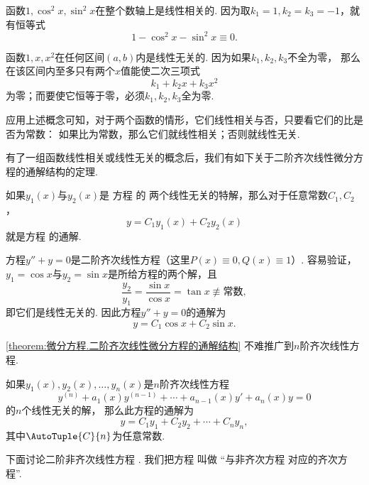 \begin{example}
函数\(1,\cos^2 x, \sin^2 x\)在整个数轴上是线性相关的.
因为取\(k_1=1,k_2=k_3=-1\)，就有恒等式\[
	1 - \cos^2 x - \sin^2 x \equiv 0.
\]

函数\(1,x,x^2\)在任何区间\((a,b)\)内是线性无关的.
因为如果\(k_1,k_2,k_3\)不全为零，
那么在该区间内至多只有两个\(x\)值能使二次三项式\[
	k_1 + k_2 x + k_3 x^2
\]为零；而要使它恒等于零，必须\(k_1,k_2,k_3\)全为零.
\end{example}

应用上述概念可知，对于两个函数的情形，它们线性相关与否，只要看它们的比是否为常数：
如果比为常数，那么它们就线性相关；否则就线性无关.

有了一组函数线性相关或线性无关的概念后，我们有如下关于二阶齐次线性微分方程的通解结构的定理.
\begin{theorem}\label{theorem:微分方程.二阶齐次线性微分方程的通解结构}
如果\(y_1(x)\)与\(y_2(x)\)是
方程  的
两个线性无关的特解，那么对于任意常数\(C_1,C_2\)，\[
	y = C_1 y_1(x) + C_2 y_2(x)
\]
就是方程  的通解.
\end{theorem}

\begin{example}
方程\(y'' + y = 0\)是二阶齐次线性方程（这里\(P(x)\equiv0, Q(x)\equiv1\)）.
容易验证，\(y_1 = \cos x\)与\(y_2 = \sin x\)是所给方程的两个解，且\[
	\frac{y_2}{y_1} = \frac{\sin x}{\cos x} = \tan x \not\equiv\text{常数},
\]
即它们是线性无关的.
因此方程\(y'' + y = 0\)的通解为\[
	y = C_1 \cos x + C_2 \sin x.
\]
\end{example}

\cref{theorem:微分方程.二阶齐次线性微分方程的通解结构} 不难推广到\(n\)阶齐次线性方程.
\begin{corollary}\label{theorem:微分方程.n阶齐次线性微分方程的通解结构}
如果\(y_1(x),y_2(x),\dotsc,y_n(x)\)是\(n\)阶齐次线性方程\[
	y^{(n)} + a_1(x) y^{(n-1)} + \dotsb + a_{n-1}(x) y' + a_n(x) y = 0
\]的\(n\)个线性无关的解，
那么此方程的通解为\[
	y = C_1 y_1 + C_2 y_2 + \dotsb + C_n y_n,
\]
其中\(\AutoTuple{C}{n}\)为任意常数.
\end{corollary}

下面讨论二阶非齐次线性方程 .
我们把方程  叫做%
“与非齐次方程  对应的齐次方程”.


